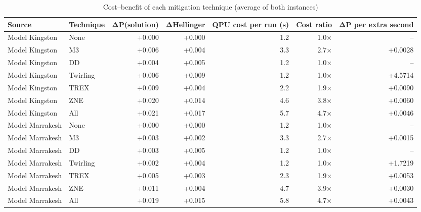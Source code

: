 \begin{table}[t]
\centering
\small
\caption{Cost–benefit of each mitigation technique (average of both instances)}
\label{tab:cost}
\begin{tabular}{llrrrrr}
\toprule
Source & Technique & ΔP(solution) & ΔHellinger & QPU cost per run (s) & Cost ratio & ΔP per extra second \\
\midrule
Model Kingston & None & +0.000 & +0.000 & 1.2 & 1.0× & – \\
Model Kingston & M3 & +0.006 & +0.004 & 3.3 & 2.7× & +0.0028 \\
Model Kingston & DD & +0.004 & +0.005 & 1.2 & 1.0× & – \\
Model Kingston & Twirling & +0.006 & +0.009 & 1.2 & 1.0× & +4.5714 \\
Model Kingston & TREX & +0.009 & +0.004 & 2.2 & 1.9× & +0.0090 \\
Model Kingston & ZNE & +0.020 & +0.014 & 4.6 & 3.8× & +0.0060 \\
Model Kingston & All & +0.021 & +0.017 & 5.7 & 4.7× & +0.0046 \\
Model Marrakesh & None & +0.000 & +0.000 & 1.2 & 1.0× & – \\
Model Marrakesh & M3 & +0.003 & +0.002 & 3.3 & 2.7× & +0.0015 \\
Model Marrakesh & DD & +0.003 & +0.005 & 1.2 & 1.0× & – \\
Model Marrakesh & Twirling & +0.002 & +0.004 & 1.2 & 1.0× & +1.7219 \\
Model Marrakesh & TREX & +0.005 & +0.003 & 2.3 & 1.9× & +0.0053 \\
Model Marrakesh & ZNE & +0.011 & +0.004 & 4.7 & 3.9× & +0.0030 \\
Model Marrakesh & All & +0.019 & +0.015 & 5.8 & 4.7× & +0.0043 \\
\bottomrule
\end{tabular}
\end{table}

